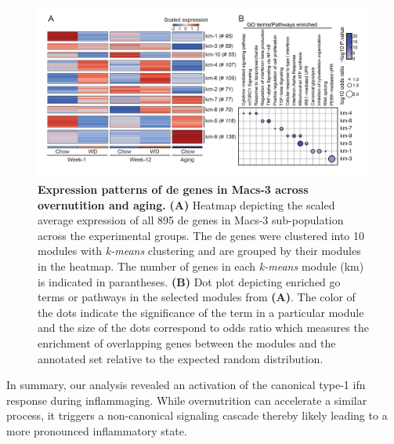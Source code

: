 \begin{figure}[t]
\centering
\includegraphics[width=\linewidth]{Chapter4/Fig/F2-11-02.png}
\caption[Expression patterns of  genes in Macs-3 across overnutition and aging]{\textbf{Expression patterns of \gls{de} genes in Macs-3 across overnutition and aging.} \textbf{(A)} Heatmap depicting the scaled average expression of all 895 \gls{de} genes in Macs-3 sub-population across the experimental groups. The \gls{de} genes were clustered into 10 modules with \textit{k-means} clustering and are grouped by their modules in the heatmap. The number of genes in each \textit{k-means} module (km) is indicated in parantheses. \textbf{(B)} Dot plot depicting enriched \gls{go} terms or pathways in the selected modules from \textbf{(A)}. The color of the dots indicate the significance of the term in a particular module and the size of the dots correspond to odds ratio which measures the enrichment of overlapping genes between the modules and the annotated set relative to the expected random distribution.}
\label{fig:chp2_scrna_macrophages_macs3_clust}
\end{figure}

\par In summary, our analysis revealed an activation of the canonical type-1 \gls{ifn} response during inflammaging. While overnutrition can accelerate a similar process, it triggers a non-canonical signaling cascade thereby likely leading to a more pronounced inflammatory state.


\clearpage

